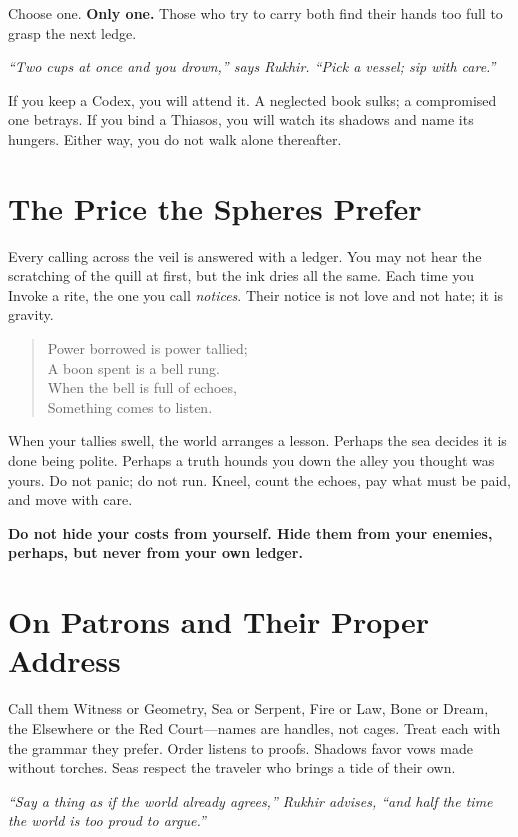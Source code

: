 \documentclass[12pt,twoside]{book}
\newcommand{\shadow}[1]{\textit{#1}}
\newcommand{\whisper}[1]{\textbf{#1}}
\begin{document}
Choose one. \textbf{Only one.} Those who try to carry both find their hands too full to grasp the next ledge.

\shadow{``Two cups at once and you drown,'' says Rukhir. ``Pick a vessel; sip with care.''}

If you keep a Codex, you will attend it. A neglected book sulks; a compromised one betrays. If you bind a Thiasos, you will watch its shadows and name its hungers. Either way, you do not walk alone thereafter.

\section*{The Price the Spheres Prefer}
Every calling across the veil is answered with a ledger. You may not hear the scratching of the quill at first, but the ink dries all the same. Each time you Invoke a rite, the one you call \emph{notices}. Their notice is not love and not hate; it is gravity.

\begin{verse}
Power borrowed is power tallied; \\
A boon spent is a bell rung. \\
When the bell is full of echoes, \\
Something comes to listen.
\end{verse}

When your tallies swell, the world arranges a lesson. Perhaps the sea decides it is done being polite. Perhaps a truth hounds you down the alley you thought was yours. Do not panic; do not run. Kneel, count the echoes, pay what must be paid, and move with care.

\whisper{Do not hide your costs from yourself. Hide them from your enemies, perhaps, but never from your own ledger.}

\section*{On Patrons and Their Proper Address}
Call them Witness or Geometry, Sea or Serpent, Fire or Law, Bone or Dream, the Elsewhere or the Red Court—names are handles, not cages. Treat each with the grammar they prefer. Order listens to proofs. Shadows favor vows made without torches. Seas respect the traveler who brings a tide of their own.

\shadow{``Say a thing as if the world already agrees,'' Rukhir advises, ``and half the time the world is too proud to argue.''}
\end{document}

